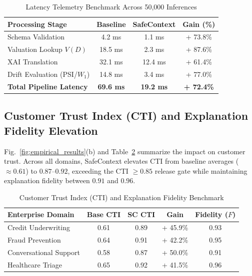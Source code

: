 \documentclass[journal]{IEEEtran}
\begin{document}
\begin{table}[h]
\caption{Latency Telemetry Benchmark Across 50,000 Inferences}
\label{tab:latency_benchmarks}
\centering
\small
\begin{tabular}{p{3.2cm}ccc}
\toprule
\textbf{Processing Stage} & \textbf{Baseline} & \textbf{SafeContext} & \textbf{Gain (\%)} \\
\midrule
Schema Validation & 4.2 ms & 1.1 ms & + 73.8\% \\
Valuation Lookup $V(D)$ & 18.5 ms & 2.3 ms & + 87.6\% \\
XAI Translation & 32.1 ms & 12.4 ms & + 61.4\% \\
Drift Evaluation (PSI/$W_1$) & 14.8 ms & 3.4 ms & + 77.0\% \\
\midrule
\textbf{Total Pipeline Latency} & \textbf{69.6 ms} & \textbf{19.2 ms} & \textbf{+ 72.4\%} \\
\bottomrule
\end{tabular}
\end{table}

\subsection{Customer Trust Index (CTI) and Explanation Fidelity Elevation}
Fig.~\ref{fig:empirical_results}(b) and Table~\ref{tab:cti_benchmarks} summarize the impact on customer trust. Across all domains, SafeContext elevates CTI from baseline averages ($\approx 0.61$) to $0.87$--$0.92$, exceeding the CTI $\ge 0.85$ release gate while maintaining explanation fidelity between $0.91$ and $0.96$.

\begin{table}[h]
\caption{Customer Trust Index (CTI) and Explanation Fidelity Benchmark}
\label{tab:cti_benchmarks}
\centering
\small
\begin{tabular}{p{3.0cm}cccc}
\toprule
\textbf{Enterprise Domain} & \textbf{Base CTI} & \textbf{SC CTI} & \textbf{Gain} & \textbf{Fidelity ($F$)} \\
\midrule
Credit Underwriting & 0.61 & 0.89 & + 45.9\% & 0.93 \\
Fraud Prevention & 0.64 & 0.91 & + 42.2\% & 0.95 \\
Conversational Support & 0.58 & 0.87 & + 50.0\% & 0.91 \\
Healthcare Triage & 0.65 & 0.92 & + 41.5\% & 0.96 \\
\bottomrule
\end{tabular}
\end{table}
\end{document}
